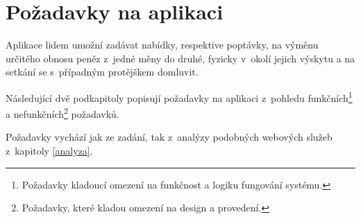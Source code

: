\chapter{Požadavky na aplikaci}
\label{requirements}

Aplikace lidem umožní zadávat nabídky, respektive poptávky, na výměnu určitého obnosu peněz z~jedné měny do druhé, fyzicky v~okolí jejich výskytu a na setkání se s~případným protějškem domluvit.

Následující dvě podkapitoly popisují požadavky na aplikaci z~pohledu funkčních\footnote{Požadavky kladoucí omezení na funkčnost a logiku fungování systému.} a nefunkčních\footnote{Požadavky, které kladou omezení na design a provedení.} požadavků.

Požadavky vychází jak ze zadání, tak z~analýzy podobných webových služeb z~kapitoly \ref{analyza}.
